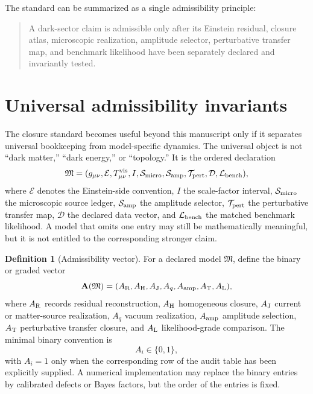 \documentclass[
  aps,
  prd,
  reprint,
  superscriptaddress,
  floatfix,
  nofootinbib,
  longbibliography
]{revtex4-2}
\theoremstyle{plain}
\theoremstyle{definition}
\newtheorem{definition}[theorem]{Definition}
\theoremstyle{remark}
\newcommand{\vis}{\mathrm{vis}}
\begin{document}
The standard can be summarized as a single admissibility principle:
\begin{quote}
A dark-sector claim is admissible only after its Einstein residual, closure
atlas, microscopic realization, amplitude selector, perturbative transfer map,
and benchmark likelihood have been separately declared and invariantly tested.
\end{quote}

\section{Universal admissibility invariants}

The closure standard becomes useful beyond this manuscript only if it separates
universal bookkeeping from model-specific dynamics.  The universal object is not
``dark matter,'' ``dark energy,'' or ``topology.''  It is the ordered declaration
\begin{equation}
\mathfrak M=
(g_{\mu\nu},\mathcal E,T^{\vis}_{\mu\nu},I,\mathcal S_{\rm micro},
\mathcal S_{\rm amp},\mathcal T_{\rm pert},\mathcal D,\mathcal L_{\rm bench}),
\label{eq:model_declaration_v28}
\end{equation}
where \(\mathcal E\) denotes the Einstein-side convention, \(I\) the
scale-factor interval, \(\mathcal S_{\rm micro}\) the microscopic source ledger,
\(\mathcal S_{\rm amp}\) the amplitude selector, \(\mathcal T_{\rm pert}\) the
perturbative transfer map, \(\mathcal D\) the declared data vector, and
\(\mathcal L_{\rm bench}\) the matched benchmark likelihood.  A model that omits
one entry may still be mathematically meaningful, but it is not entitled to the
corresponding stronger claim.

\begin{definition}[Admissibility vector]
For a declared model \(\mathfrak M\), define the binary or graded vector
\begin{equation}
\mathbf A(\mathfrak M)=
(A_{\rm R},A_{\rm H},A_{\rm J},A_q,A_{\rm amp},A_{\rm T},A_{\rm L}),
\label{eq:admissibility_vector_v28}
\end{equation}
where \(A_{\rm R}\) records residual reconstruction, \(A_{\rm H}\) homogeneous
closure, \(A_{\rm J}\) current or matter-source realization, \(A_q\) vacuum
realization, \(A_{\rm amp}\) amplitude selection, \(A_{\rm T}\) perturbative
transfer closure, and \(A_{\rm L}\) likelihood-grade comparison.  The minimal
binary convention is
\begin{equation}
A_i\in\{0,1\},
\end{equation}
with \(A_i=1\) only when the corresponding row of the audit table has been
explicitly supplied.  A numerical implementation may replace the binary entries
by calibrated defects or Bayes factors, but the order of the entries is fixed.
\end{definition}
\end{document}
